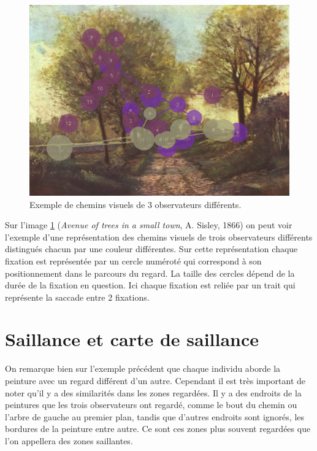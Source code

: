 \begin{figure}[!ht]
    \centering
    \includegraphics[width=0.7\linewidth]{datas/exemple_scanpaths2.png}
    \caption{Exemple de chemins visuels de 3 observateurs différents.}
    \label{ex_scanpath}
\end{figure}

\par
Sur l'image \ref{ex_scanpath} (\emph{Avenue of trees in a small town}, A. Sisley, 1866) on peut voir l'exemple d'une représentation des chemins visuels de trois observateurs différents distingués chacun par une couleur différentes. Sur cette représentation chaque fixation est représentée par un cercle numéroté qui correspond à son positionnement dans le parcours du regard. La taille des cercles dépend de la durée de la fixation en question. Ici chaque fixation est reliée par un trait qui représente la saccade entre 2 fixations.

\section{Saillance et carte de saillance}
\par
On remarque bien sur l'exemple précédent que chaque individu aborde la peinture avec un regard différent d'un autre. Cependant il est très important de noter qu'il y a des similarités dans les zones regardées. Il y a des endroits de la peintures que les trois observateurs ont regardé, comme le bout du chemin ou l'arbre de gauche au premier plan, tandis que d'autres endroits sont ignorés, les bordures de la peinture entre autre. Ce sont ces zones plus souvent regardées que l'on appellera des zones saillantes.

